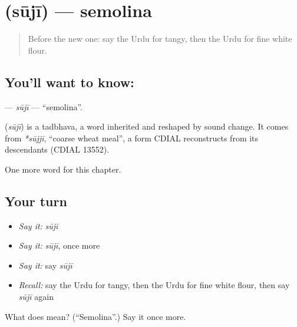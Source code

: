 \section[\texorpdfstring{\ur{سوجی} (sūjī)}{سوجی (sūjī)}]{ (sūjī) — semolina}

\label{lesson:UR-C259-suji}



\begin{quote}
Before the new one: say the Urdu for tangy, then the Urdu for fine white flour.
\end{quote}

\subsection*{You'll want to know: }
\textbf{} — \emph{sūjī} — \textquotedblleft{}semolina\textquotedblright{}.

\begin{cousinweb}
\textbf{} (\emph{sūjī}) is a tadbhava, a word inherited and reshaped by sound change. It comes from \emph{*sūjjī}, \textquotedblleft{}coarse wheat meal\textquotedblright{}, a form CDIAL reconstructs from its descendants (CDIAL 13552).
\end{cousinweb}

\begin{grammarlens}[title={What you've built}]
One more word for this chapter.
\end{grammarlens}

\subsection*{Your turn}
\begin{itemize}
\raggedright
  \item \emph{Say it:} \emph{sūjī}
  \item \emph{Say it:} \emph{sūjī}, once more
  \item \emph{Say it:} say \emph{sūjī}
  \item \emph{Recall:} say the Urdu for tangy, then the Urdu for fine white flour, then say \emph{sūjī} again
\end{itemize}

\begin{tcolorbox}[breakable,colback=teal!4,colframe=teal!35!black,title={Before you move on}]
What does  mean? (\textquotedblleft{}Semolina\textquotedblright{}.) Say it once more.
\end{tcolorbox}
